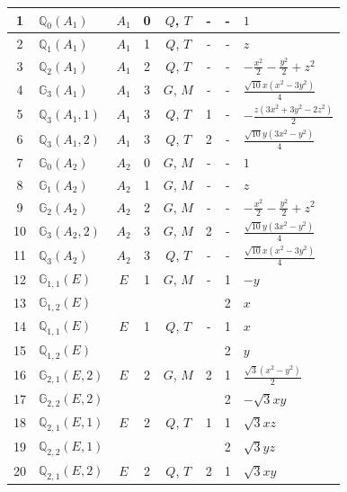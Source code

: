 \documentclass[fleqn,10pt,landscape]{jsarticle}
\begin{document}
\begin{longtable}[l]{clcccccl}
1 & $\mathbb{Q}_{0}(A_{1})$ & $A_{1}$ & 0 & $Q$, $T$ & - & - & $1$ \\ \hline
2 & $\mathbb{Q}_{1}(A_{1})$ & $A_{1}$ & 1 & $Q$, $T$ & - & - & $z$ \\ \hline
3 & $\mathbb{Q}_{2}(A_{1})$ & $A_{1}$ & 2 & $Q$, $T$ & - & - & $- \frac{x^{2}}{2} - \frac{y^{2}}{2} + z^{2}$ \\ \hline
4 & $\mathbb{G}_{3}(A_{1})$ & $A_{1}$ & 3 & $G$, $M$ & - & - & $\frac{\sqrt{10} x \left(x^{2} - 3 y^{2}\right)}{4}$ \\ \hline
5 & $\mathbb{Q}_{3}(A_{1},1)$ & $A_{1}$ & 3 & $Q$, $T$ & 1 & - & $- \frac{z \left(3 x^{2} + 3 y^{2} - 2 z^{2}\right)}{2}$ \\ \hline
6 & $\mathbb{Q}_{3}(A_{1},2)$ & $A_{1}$ & 3 & $Q$, $T$ & 2 & - & $\frac{\sqrt{10} y \left(3 x^{2} - y^{2}\right)}{4}$ \\ \hline
7 & $\mathbb{G}_{0}(A_{2})$ & $A_{2}$ & 0 & $G$, $M$ & - & - & $1$ \\ \hline
8 & $\mathbb{G}_{1}(A_{2})$ & $A_{2}$ & 1 & $G$, $M$ & - & - & $z$ \\ \hline
9 & $\mathbb{G}_{2}(A_{2})$ & $A_{2}$ & 2 & $G$, $M$ & - & - & $- \frac{x^{2}}{2} - \frac{y^{2}}{2} + z^{2}$ \\ \hline
10 & $\mathbb{G}_{3}(A_{2},2)$ & $A_{2}$ & 3 & $G$, $M$ & 2 & - & $\frac{\sqrt{10} y \left(3 x^{2} - y^{2}\right)}{4}$ \\ \hline
11 & $\mathbb{Q}_{3}(A_{2})$ & $A_{2}$ & 3 & $Q$, $T$ & - & - & $\frac{\sqrt{10} x \left(x^{2} - 3 y^{2}\right)}{4}$ \\ \hline
12 & $\mathbb{G}_{1,1}(E)$ & $E$ & 1 & $G$, $M$ & - & 1 & $- y$ \\
13 & $\mathbb{G}_{1,2}(E)$ &  &  &  &  & 2 & $x$ \\ \hline
14 & $\mathbb{Q}_{1,1}(E)$ & $E$ & 1 & $Q$, $T$ & - & 1 & $x$ \\
15 & $\mathbb{Q}_{1,2}(E)$ &  &  &  &  & 2 & $y$ \\ \hline
16 & $\mathbb{G}_{2,1}(E,2)$ & $E$ & 2 & $G$, $M$ & 2 & 1 & $\frac{\sqrt{3} \left(x^{2} - y^{2}\right)}{2}$ \\
17 & $\mathbb{G}_{2,2}(E,2)$ &  &  &  &  & 2 & $- \sqrt{3} x y$ \\ \hline
18 & $\mathbb{Q}_{2,1}(E,1)$ & $E$ & 2 & $Q$, $T$ & 1 & 1 & $\sqrt{3} x z$ \\
19 & $\mathbb{Q}_{2,2}(E,1)$ &  &  &  &  & 2 & $\sqrt{3} y z$ \\ \hline
20 & $\mathbb{Q}_{2,1}(E,2)$ & $E$ & 2 & $Q$, $T$ & 2 & 1 & $\sqrt{3} x y$ \\

\end{longtable}
\end{document}

